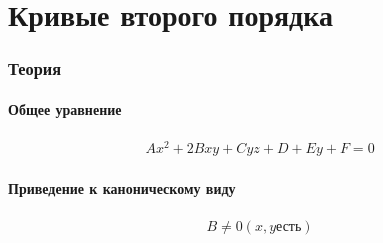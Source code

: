 \documentclass{article}
\begin{document}
\part{Кривые второго порядка}

\section{Теория}

\subsection{Общее уравнение}
\begin{gather*}
    Ax^2 + 2Bxy + Cyz + D + Ey + F = 0
\end{gather*}

\subsection{Приведение к каноническому виду}
\begin{gather*}
    B \neq 0 (x, y \text{есть})
\end{gather*}
\end{document}
